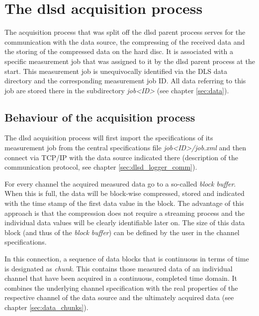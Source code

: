 \documentclass[a4paper,12pt,BCOR6mm,bibtotoc,idxtotoc]{scrbook}
\begin{document}

\section{The dlsd acquisition process} \label{sec:dlsd_logger} 

The acquisition process that was split off the dlsd parent process serves for the communication with the data source, the compressing of the received data and the storing of the compressed data on the hard disc. It is associated with a specific measurement job that was assigned to it by the dlsd parent process at the start. This measurement job is unequivocally identified via the DLS data directory and the corresponding measurement job ID. All data referring to this job are stored there in the subdirectory \textit{job\textless ID\textgreater}  (see chapter \ref{sec:data}).


\subsection{Behaviour of the acquisition process} \label{sec:dlsd_logger_behaviour}

The dlsd acquisition process will first import the specifications of its measurement job from the central specifications file \textit{job\textless ID\textgreater/job.xml} and then connect via TCP/IP with the data source indicated there (description of the communication protocol, see chapter \ref{sec:dlsd_logger_comm}).

For every channel the acquired measured data go to a so-called \textit{block buffer}. When this is full, the data will be block-wise compressed, stored and indicated with the time stamp of the first data value in the block. The advantage of this approach is that the compression does not require a streaming process and the individual data values will be clearly identifiable later on. The size of this data block (and thus of the \textit{block buffer}) can be defined by the user in the channel specifications.

In this connection, a sequence of data blocks that is continuous in terms of time is designated as \textit{chunk}. This contains those measured data of an individual channel that have been acquired in a continuous, completed time domain. It combines the underlying channel specification with the real properties of the respective channel of the data source and the ultimately acquired data (see chapter \ref{sec:data_chunks}).
\end{document}
